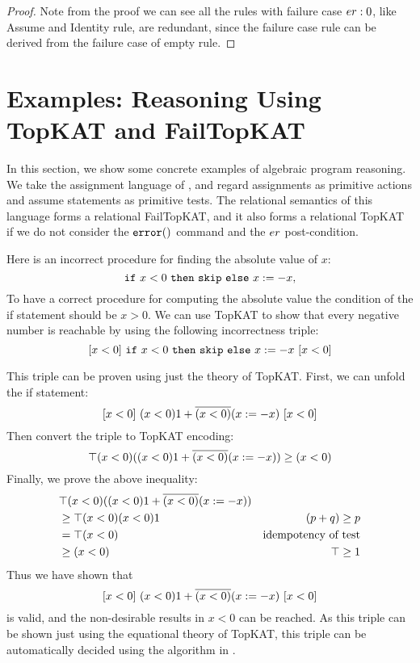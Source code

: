 \begin{proof}
    Note from the proof we can see all the rules with failure case \(\mathinner{er}: 0\),
    like Assume and Identity rule,
    are redundant, since the failure case rule can be derived from the failure case of empty rule.
\end{proof}


\section{Examples: Reasoning Using TopKAT and FailTopKAT}

In this section, we show some concrete examples of algebraic program reasoning.
We take the assignment language of \citet{OHearn_2020},
and regard assignments as primitive actions and assume statements as primitive tests.
The relational semantics of this language forms a relational FailTopKAT,
and it also forms a relational TopKAT if we do not consider the \(\mathtt{error ()}\) command and
the \(\mathinner{er}\) post-condition.

\begin{example}\label{exp: incorrect absolute value}
    Here is an incorrect procedure for finding the absolute value of \(x\):
    \[\mathtt{if}~x < 0~\mathtt{then}~\mathtt{skip}~\mathtt{else}~x:= -x,\]
    To have a correct procedure for computing the absolute value the condition of the if statement should be \(x > 0\).
    We can use TopKAT to show that every negative number is reachable by using 
    the following incorrectness triple: 
    \[[x < 0]~\mathtt{if}~x < 0~\mathtt{then}~\mathtt{skip}~\mathtt{else}~x:= -x~[x < 0]\]

This triple can be proven using just the theory of TopKAT. 
First, we can unfold the if statement:
\[[x < 0]~ (x < 0) 1 + \overline{(x < 0)} (x:= -x)~[x < 0]\]
Then convert the triple to TopKAT encoding: 
\[\top(x < 0) ((x < 0) 1 + \overline{(x < 0)} (x:= -x)) \geq (x < 0)\]
Finally, we prove the above inequality:
\begin{align*}
    & \top(x < 0) ((x < 0) 1 + \overline{(x < 0)} (x:= -x))\\
    & \geq \top (x < 0) (x < 0) 1 
        & (p + q) \geq p\\
    & = \top (x < 0) 
        & \text{idempotency of test} \\
    & \geq (x < 0)  & \top \geq 1
\end{align*}
Thus we have shown that 
\[[x < 0]~ (x < 0) 1 + \overline{(x < 0)} (x:= -x)~[x < 0]\]
is valid, and the non-desirable results in \(x < 0\) can be reached.
As this triple can be shown just using the equational theory of TopKAT, 
this triple can be automatically decided using the algorithm in .
\end{example}     

